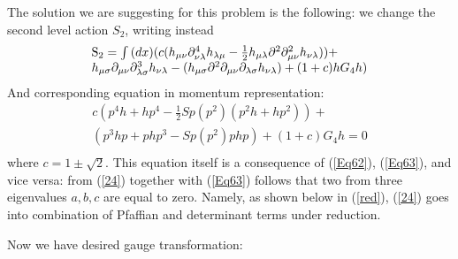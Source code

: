 \documentclass[a4paper,12pt]{article}
\begin{document}
The solution we are suggesting for this problem  is the following:
we change the second level action $S_2$, writing instead
\begin{equation}
\begin{array}{l}
 {\rm S}_{\rm 2}  = \int {(dx)(c(h_{\mu \nu } \partial ^4 _{\nu \lambda } h_{\lambda \mu } }  - \frac{1}{2}h_{\mu \lambda } \partial ^2 \partial ^2 _{\mu \nu } h_{\nu \lambda } )) +  \label{24}\\
 h_{\mu \sigma } \partial _{\mu \nu } \partial ^3 _{\lambda \sigma } h_{\nu \lambda }  - (h_{\mu \sigma } \partial ^2 \partial _{\mu \nu } \partial _{\lambda \sigma } h_{\nu \lambda } ) + (1 + c)hG_4 h) \\
 \end{array}
\end{equation}
And corresponding equation in momentum representation:
\begin{equation}
\begin{array}{l}
 c(p^4 h + hp^4  - \frac{1}{2}Sp(p^2 )(p^2 h + hp^2 )) +  \\
 (p^3 hp + php^3  - Sp(p^2 )php) + (1 + c)G_4 h =0\\
 \end{array}
\end{equation}
where $c = 1 \pm \sqrt 2$. This equation itself is a consequence
 of (\ref{Eq62}), (\ref{Eq63}), and vice versa: from (\ref{24}) together with
 (\ref{Eq63}) follows that two from three eigenvalues $a, b, c$
 are equal to zero. Namely, as shown below in (\ref{red}),
 (\ref{24}) goes into combination of Pfaffian and determinant
 terms under reduction.

Now we have desired gauge transformation:
\end{document}
